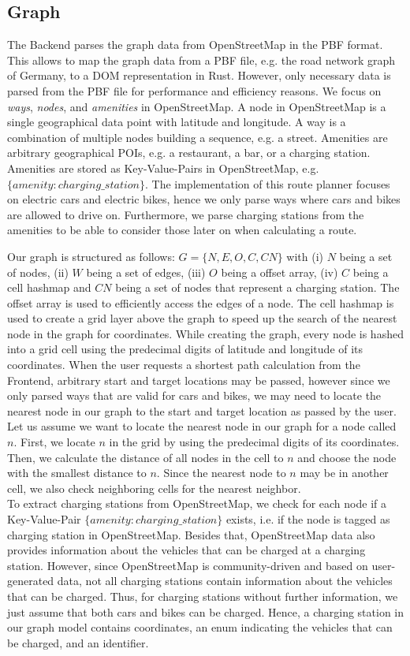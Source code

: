 \documentclass[a4paper]{article}
\begin{document}
\subsection{Graph}
The Backend parses the graph data from OpenStreetMap in the PBF format.
This allows to map the graph data from a PBF file, e.g. the road network graph of Germany, to a DOM representation in Rust.
However, only necessary data is parsed from the PBF file for performance and efficiency reasons.
We focus on \textit{ways}, \textit{nodes}, and \textit{amenities} in OpenStreetMap. A node in OpenStreetMap is a single geographical data point with latitude and longitude. A way is a combination of multiple nodes building a sequence, e.g. a street.
Amenities are arbitrary geographical POIs, e.g. a restaurant, a bar, or a charging station.
Amenities are stored as Key-Value-Pairs in OpenStreetMap, e.g. $\lbrace amenity: charging\_station \rbrace$.
The implementation of this route planner focuses on electric cars and electric bikes, hence we only parse ways where cars and bikes are allowed to drive on.
Furthermore, we parse charging stations from the amenities to be able to consider those later on when calculating a route.\par\medskip
Our graph is structured as follows: $G = \lbrace N, E, O, C, CN \rbrace$ with (i) $N$ being a set of nodes, (ii) $W$ being a set of edges, (iii) $O$ being a offset array, (iv) $C$ being a cell hashmap and $CN$ being a set of nodes that represent a charging station.
The offset array is used to efficiently access the edges of a node. The cell hashmap is used to create a grid layer above the graph to speed up the search of the nearest node in the graph for coordinates.
While creating the graph, every node is hashed into a grid cell using the predecimal digits of latitude and longitude of its coordinates.
When the user requests a shortest path calculation from the Frontend, arbitrary start and target locations may be passed, however since we only parsed ways that are valid for cars and bikes, we may need to locate the nearest node in our graph to the start and target location as passed by the user.
Let us assume we want to locate the nearest node in our graph for a node called $n$.
First, we locate $n$ in the grid by using the predecimal digits of its coordinates. 
Then, we calculate the distance of all nodes in the cell to $n$ and choose the node with the smallest distance to $n$.
Since the nearest node to $n$ may be in another cell, we also check neighboring cells for the nearest neighbor.\\
To extract charging stations from OpenStreetMap, we check for each node if a Key-Value-Pair $\lbrace amenity: charging\_station \rbrace$ exists, i.e. if the node is tagged as charging station in OpenStreetMap.
Besides that, OpenStreetMap data also provides information about the vehicles that can be charged at a charging station.
However, since OpenStreetMap is community-driven and based on user-generated data, not all charging stations contain information about the vehicles that can be charged.
Thus, for charging stations without further information, we just assume that both cars and bikes can be charged.
Hence, a charging station in our graph model contains coordinates, an enum indicating the vehicles that can be charged, and an identifier.
\end{document}
